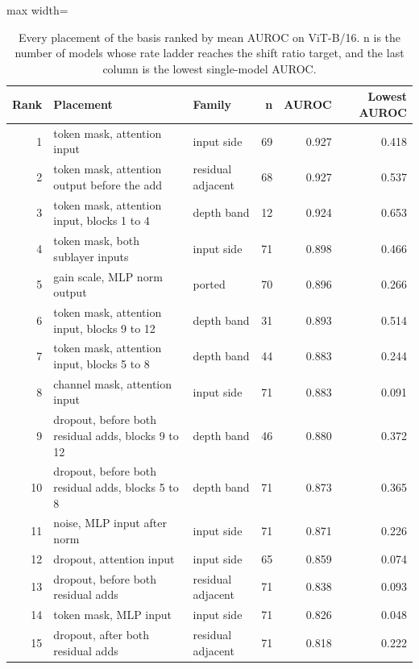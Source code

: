 \begin{table}[htbp]
\centering
\small
\caption{Every placement of the basis ranked by mean AUROC on ViT-B/16. n is the number of models whose rate ladder reaches the shift ratio target, and the last column is the lowest single-model AUROC.}
\label{tab:basis-ranking}
\begin{adjustbox}{max width=\linewidth}
\begin{tabular}{rllrrr}
\toprule
Rank & Placement & Family & n & AUROC & Lowest AUROC \\
\midrule
1 & token mask, attention input & input side & 69 & 0.927 & 0.418 \\
2 & token mask, attention output before the add & residual adjacent & 68 & 0.927 & 0.537 \\
3 & token mask, attention input, blocks 1 to 4 & depth band & 12 & 0.924 & 0.653 \\
4 & token mask, both sublayer inputs & input side & 71 & 0.898 & 0.466 \\
5 & gain scale, MLP norm output & ported & 70 & 0.896 & 0.266 \\
6 & token mask, attention input, blocks 9 to 12 & depth band & 31 & 0.893 & 0.514 \\
7 & token mask, attention input, blocks 5 to 8 & depth band & 44 & 0.883 & 0.244 \\
8 & channel mask, attention input & input side & 71 & 0.883 & 0.091 \\
9 & dropout, before both residual adds, blocks 9 to 12 & depth band & 46 & 0.880 & 0.372 \\
10 & dropout, before both residual adds, blocks 5 to 8 & depth band & 71 & 0.873 & 0.365 \\
11 & noise, MLP input after norm & input side & 71 & 0.871 & 0.226 \\
12 & dropout, attention input & input side & 65 & 0.859 & 0.074 \\
13 & dropout, before both residual adds & residual adjacent & 71 & 0.838 & 0.093 \\
14 & token mask, MLP input & input side & 71 & 0.826 & 0.048 \\
15 & dropout, after both residual adds & residual adjacent & 71 & 0.818 & 0.222 \\

\end{tabular}
\end{adjustbox}
\end{table}
